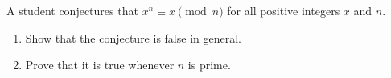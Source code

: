 A student conjectures that $x^n\equiv x\pmod n$ for all positive integers $x$ and $n$.
\begin{enumerate}
\item[(a)] Show that the conjecture is false in general.
\item[(b)] Prove that it is true whenever $n$ is prime.
\end{enumerate}
